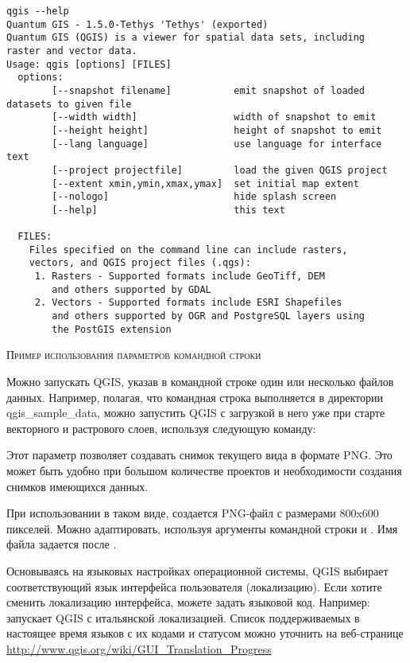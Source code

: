 \small
\begin{verbatim}
qgis --help
Quantum GIS - 1.5.0-Tethys 'Tethys' (exported)
Quantum GIS (QGIS) is a viewer for spatial data sets, including
raster and vector data.
Usage: qgis [options] [FILES]
  options:
        [--snapshot filename]           emit snapshot of loaded datasets to given file
        [--width width]                 width of snapshot to emit
        [--height height]               height of snapshot to emit
        [--lang language]               use language for interface text
        [--project projectfile]         load the given QGIS project
        [--extent xmin,ymin,xmax,ymax]  set initial map extent
        [--nologo]                      hide splash screen
        [--help]                        this text

  FILES:
    Files specified on the command line can include rasters,
    vectors, and QGIS project files (.qgs):
     1. Rasters - Supported formats include GeoTiff, DEM
        and others supported by GDAL
     2. Vectors - Supported formats include ESRI Shapefiles
        and others supported by OGR and PostgreSQL layers using
        the PostGIS extension
\end{verbatim}
\normalsize

\begin{Tip} \caption{\textsc{Пример использования параметров командной строки}}
Можно запускать QGIS, указав в командной строке один или несколько файлов
данных. Например, полагая, что командная строка выполняется в директории
qgis\_sample\_data, можно запустить QGIS с загрузкой в него уже при
старте векторного и растрового слоев, используя следующую команду: \\
\end{Tip}

Этот параметр позволяет создавать снимок текущего вида в формате PNG.
Это может быть удобно при большом количестве проектов и необходимости
создания снимков имеющихся данных.

При использовании в таком виде, создается PNG-файл с размерами 800x600
пикселей. Можно адаптировать, используя аргументы командной строки
 и . Имя файла задается после
.

Основываясь на языковых настройках операционной системы, QGIS выбирает
соответствующий язык интерфейса пользователя (локализацию). Если хотите
сменить локализацию интерфейса, можете задать языковой код. Например:
 запускает QGIS с итальянской локализацией. Список
поддерживаемых в настоящее время языков с их кодами и статусом можно
уточнить на веб-странице
\url{http://www.qgis.org/wiki/GUI_Translation_Progress}

